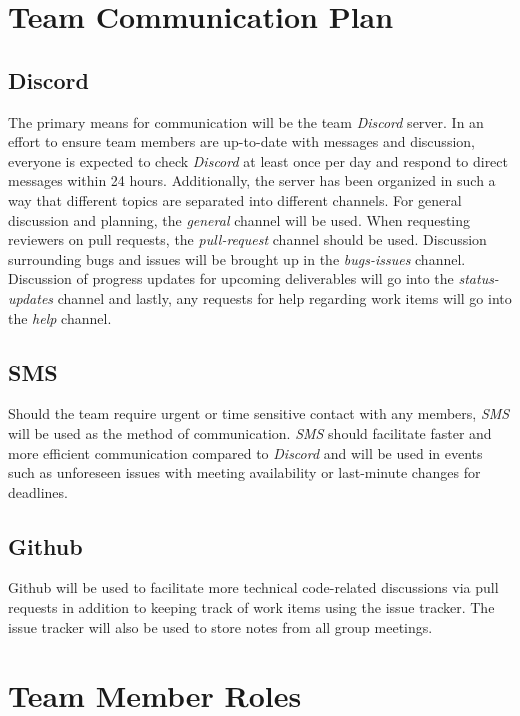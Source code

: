 \documentclass{article}
\begin{document}
\section{Team Communication Plan}

\subsection{Discord}

The primary means for communication will be the team \emph{Discord} server. In an effort to
ensure team members are up-to-date with messages and discussion, everyone is expected to check \emph{Discord}
at least once per day and respond to direct messages within 24 hours.
Additionally, the server has been organized in such a way that different topics are separated into different channels.
For general  discussion and planning, the \emph{general} channel will be used. When requesting reviewers on pull requests,
the \emph{pull-request} channel should be used. Discussion surrounding bugs and issues will be brought up in the
\emph{bugs-issues} channel. Discussion of progress updates for upcoming deliverables will go into the
\emph{status-updates} channel and lastly, any requests for help regarding work items will go into the \emph{help} channel.

\subsection{SMS}

Should the team require urgent or time sensitive contact with any members, \emph{SMS} will be used as the method
of communication. \emph{SMS} should facilitate faster and more efficient communication compared to \emph{Discord}
and will be used in events such as unforeseen issues with meeting availability or last-minute changes for deadlines.

\subsection{Github}

Github will be used to facilitate more technical code-related discussions via pull requests in addition to
keeping track of work items using the issue tracker. The issue tracker will also be used to store notes from
all group meetings.

\section{Team Member Roles}
\end{document}
